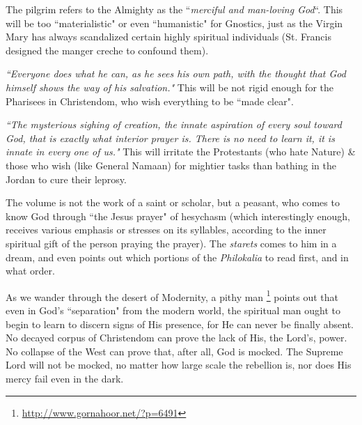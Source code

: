 The pilgrim refers to the Almighty as the ``\emph{merciful and man-loving God}``. This will be too ``materialistic" or even ``humanistic" for Gnostics, just as the Virgin Mary has always scandalized certain highly spiritual individuals (St. Francis designed the manger creche to confound them).

\emph{``Everyone does what he can, as he sees his own path, with the thought that God himself shows the way of his salvation."} This will be not rigid enough for the Pharisees in Christendom, who wish everything to be ``made clear".

\emph{``The mysterious sighing of creation, the innate aspiration of every soul toward God, that is exactly what interior prayer is. There is no need to learn it, it is innate in every one of us."} This will irritate the Protestants (who hate Nature) \& those who wish (like General Namaan) for mightier tasks than bathing in the Jordan to cure their leprosy.

The volume is not the work of a saint or scholar, but a peasant, who comes to know God through ``the Jesus prayer" of hesychasm (which interestingly enough, receives various emphasis or stresses on its syllables, according to the inner spiritual gift of the person praying the prayer). The \emph{starets} comes to him in a dream, and even points out which portions of the\emph{ Philokalia} to read first, and in what order.

As we wander through the desert of Modernity, a pithy man \footnote{\url{http://www.gornahoor.net/?p=6491}} points out that even in God's ``separation" from the modern world, the spiritual man ought to begin to learn to discern signs of His presence, for He can never be finally absent. No decayed corpus of Christendom can prove the lack of His, the Lord's, power. No collapse of the West can prove that, after all, God is mocked. The Supreme Lord will not be mocked, no matter how large scale the rebellion is, nor does His mercy fail even in the dark.

